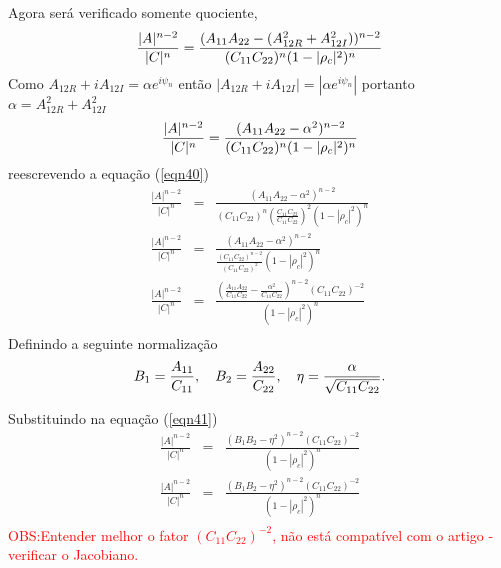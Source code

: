 Agora será verificado somente quociente,
\begin{equation}\label{eqn39}
	\frac{|A|^{n-2}}{|C|^{n}}=\frac{(A_{11}A_{22}-(A_{12R}^2+A_{12I}^2))^{n-2}}{(C_{11}C_{22})^{n}(1-|\rho_c|^2)^{n}}\\
\end{equation}
Como  $A_{12R}+iA_{12I}=\alpha e^{i\psi_n}$ então $|A_{12R}+iA_{12I}|=|\alpha e^{i\psi_n}|$ portanto $\alpha=A_{12R}^2+A_{12I}^2$ 
\begin{equation}\label{eqn40}
	\frac{|A|^{n-2}}{|C|^{n}}=\frac{(A_{11}A_{22}-\alpha^2)^{n-2}}{(C_{11}C_{22})^{n}(1-|\rho_c|^2)^{n}}\\
\end{equation}
reescrevendo a equação (\ref{eqn40})
\begin{equation}\label{eqn41}
\begin{array}{ccc}
	\frac{|A|^{n-2}}{|C|^{n}}&=&\frac{(A_{11}A_{22}-\alpha^2)^{n-2}}{(C_{11}C_{22})^{n}\left(\frac{C_{11}C_{22}}{C_{11}C_{22}}\right)^2(1-|\rho_c|^2)^{n}}\\
	\frac{|A|^{n-2}}{|C|^{n}}&=&\frac{(A_{11}A_{22}-\alpha^2)^{n-2}}{\frac{(C_{11}C_{22})^{n-2}}{\left(C_{11}C_{22}\right)^2}(1-|\rho_c|^2)^{n}}\\
	\frac{|A|^{n-2}}{|C|^{n}}&=&\frac{\left(\frac{A_{11}A_{22}}{C_{11}C_{22}}-\frac{\alpha^2}{C_{11}C_{22}}\right)^{n-2}(C_{11}C_{22})^{-2}}{(1-|\rho_c|^2)^{n}}\\
\end{array}
\end{equation}
Definindo a seguinte normalização 
\begin{equation}\label{eqn42}
	B_1=\frac{A_{11}}{C_{11}},\quad B_2=\frac{A_{22}}{C_{22}},\quad\eta=\frac{\alpha}{\sqrt{C_{11}C_{22}}}.\\
\end{equation}

Substituindo na equação (\ref{eqn41})
\begin{equation}\label{eqn43}
\begin{array}{ccc}
	\frac{|A|^{n-2}}{|C|^{n}}&=&\frac{\left(B_1B_2-\eta^2\right)^{n-2}(C_{11}C_{22})^{-2}}{(1-|\rho_c|^2)^{n}}\\
	\frac{|A|^{n-2}}{|C|^{n}}&=&\frac{\left(B_1B_2-\eta^2\right)^{n-2}(C_{11}C_{22})^{-2}}{(1-|\rho_c|^2)^{n}}\\
\end{array}
\end{equation}
\textcolor{red}{OBS:Entender melhor o fator $(C_{11}C_{22})^{-2}$, não está compatível com o artigo \cite{lee}- verificar o Jacobiano.}

